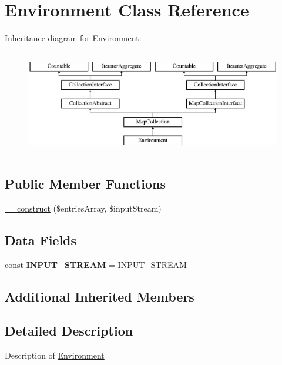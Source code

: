\hypertarget{class_pes_1_1_http_1_1_environment}{}\section{Environment Class Reference}
\label{class_pes_1_1_http_1_1_environment}
Inheritance diagram for Environment\+:\begin{figure}[H]
\begin{center}
\leavevmode
\includegraphics[height=4.635761cm]{class_pes_1_1_http_1_1_environment}
\end{center}
\end{figure}
\subsection*{Public Member Functions}
\begin{DoxyCompactItemize}
\item 
\mbox{\hyperlink{class_pes_1_1_http_1_1_environment_a003d8d65127b3dabd465d292876bb5f9}{\+\_\+\+\_\+construct}} (\$entries\+Array, \$input\+Stream)
\end{DoxyCompactItemize}
\subsection*{Data Fields}
\begin{DoxyCompactItemize}
\item 
\mbox{\label{class_pes_1_1_http_1_1_environment_a3025ac082ce9e0116bf76b2c3d610373}} 
const {\bfseries I\+N\+P\+U\+T\+\_\+\+S\+T\+R\+E\+AM} = \textquotesingle{}I\+N\+P\+U\+T\+\_\+\+S\+T\+R\+E\+AM\textquotesingle{}
\end{DoxyCompactItemize}
\subsection*{Additional Inherited Members}


\subsection{Detailed Description}
Description of \mbox{\hyperlink{class_pes_1_1_http_1_1_environment}{Environment}}

